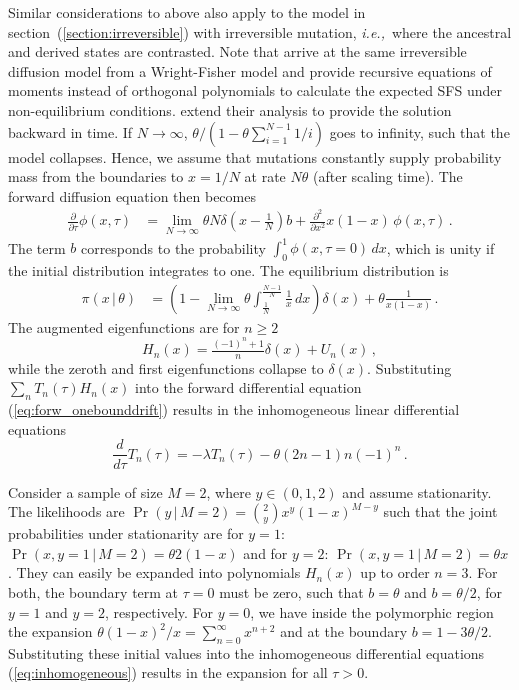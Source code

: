 \documentclass[preprint]{elsarticle}
\newcommand\given{{\,|\,}}
\newcommand\ie{{\it i.e.,}}
\begin{document}
Similar considerations to above also apply to the model in section~(\ref{section:irreversible}) with irreversible mutation, \ie\ where the ancestral and derived states are contrasted. Note that \citet{Evan07} arrive at the same irreversible diffusion model from a Wright-Fisher model and provide recursive equations of moments instead of orthogonal polynomials to calculate the expected SFS under non-equilibrium conditions. \citet{Zivk11} extend their analysis to provide the solution backward in time.  If $N\to\infty$, $\theta/(1-\theta\sum_{i=1}^{N-1}1/i)$ goes to infinity, such that the model collapses. Hence, we assume that mutations constantly supply probability mass from the boundaries to $x=1/N$ at rate $N\theta$ (after scaling time). The forward diffusion equation then becomes
\begin{equation}\label{eq:forw_onebounddrift}
\begin{split}
\frac{\partial}{\partial \tau} \phi(x,\tau)&=
    \lim_{N\to\infty}\theta N\delta(x-\tfrac1N)b+\frac{\partial^2}{\partial x^2}x(1-x)\,\phi(x,\tau)\,.
\end{split}
\end{equation}
The term $b$ corresponds to the probability $\int_0^1\phi(x,\tau=0)\,dx$, which is unity if the initial distribution integrates to one. The equilibrium distribution is 
\begin{equation}
\begin{split}
    \pi(x\given\theta)&=\left(1-\lim_{N\to\infty}\theta \int_{\tfrac1N}^{\tfrac{N-1}N} \frac1x\,dx\right)\delta(x)+\theta\frac{1}{x(1-x)}\,.
\end{split}
\end{equation}
The augmented eigenfunctions are for $n\geq 2$
\begin{equation}\label{eq:forw_onebound_eigen}
    H_n(x)=\tfrac{(-1)^n+1}{n}\delta(x)+U_n(x)\,,
\end{equation}
while the zeroth and first eigenfunctions collapse to $\delta(x)$. 
Substituting $\sum_nT_n(\tau) H_n(x)$ into the forward differential equation (\ref{eq:forw_onebounddrift}) results in the inhomogeneous linear differential equations
\begin{equation}\label{eq:inhomogeneous}
    \frac{d}{d\tau}T_n(\tau)=-\lambda T_n(\tau)-\theta (2n-1)n(-1)^n\,.
\end{equation}

Consider a sample of size $M=2$, where $y \in (0,1,2)$ and assume stationarity. The likelihoods are $\Pr(y\given M=2)=\binom{2}{y}x^{y}(1-x)^{M-y}$ such that the joint probabilities under stationarity are for $y=1$: $\Pr(x,y=1\given M=2)=\theta 2(1-x)$ and for $y=2$: $\Pr(x,y=1\given M=2)=\theta x$. They can easily be expanded into polynomials $H_n(x)$ up to order $n=3$. For both, the boundary term at $\tau=0$ must be zero, such that $b=\theta$ and $b=\theta/2$, for $y=1$ and $y=2$, respectively. For $y=0$, we have inside the polymorphic region the expansion $\theta (1-x)^2/x=\sum_{n=0}^\infty x^{n+2}$ and at the boundary $b=1-3\theta/2$. Substituting these initial values into the inhomogeneous differential equations (\ref{eq:inhomogeneous}) results in the expansion for all $\tau>0$.
\end{document}
